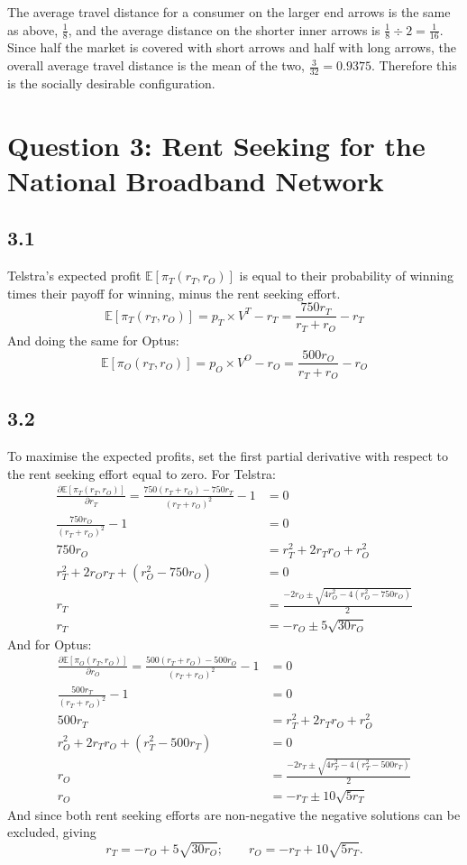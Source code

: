 \documentclass{article}
\newcommand{\tE}[1]{$\mathbb{E}[\mbox{#1}]$}
\newcommand{\E}[1]{\mathbb{E}[\mbox{#1}]}
\begin{document}
\noindent The average travel distance for a consumer on the larger end arrows is the same as above, $\frac{1}{8}$, and the average distance on the shorter inner arrows is $\frac{1}{8} \div 2 = \frac{1}{16}$. Since half the market is covered with short arrows and half with long arrows, the overall average travel distance is the mean of the two, $\frac{3}{32} = 0.9375$. Therefore this is the socially desirable configuration.

\section*{Question 3: Rent Seeking for the National Broadband Network}
\subsection*{3.1}
Telstra's expected profit \tE{$\pi_{T}(r_{T}, r_{O})$} is equal to their probability of winning times their payoff for winning, minus the rent seeking effort.
$$\E{$\pi_{T}(r_{T}, r_{O})$} = p_{T} \times V^{T} - r_{T} = \frac{750r_{T}}{r_{T} + r_{O}} - r_{T}$$
And doing the same for Optus:
$$\E{$\pi_{O}(r_{T}, r_{O})$} = p_{O} \times V^{O} - r_{O} = \frac{500r_{O}}{r_{T} + r_{O}} - r_{O}$$

\subsection*{3.2}
To maximise the expected profits, set the first partial derivative with respect to the rent seeking effort equal to zero. For Telstra:
\begin{align*}
    \frac{\partial \E{$\pi_{T}(r_{T}, r_{O})$}}{\partial r_{T}} = \frac{750(r_{T} + r_{O}) - 750r_{T}}{(r_{T} + r_{O})^{2}} - 1 &= 0\\
    \frac{750r_{O}}{(r_{T} + r_{O})^{2}} - 1 &= 0\\
    750r_{O} &= r_{T}^{2} + 2r_{T}r_{O} + r_{O}^{2}\\
    r_{T}^{2} + 2r_{O}r_{T} + (r_{O}^{2} - 750r_{O}) &= 0\\
    r_{T} &= \frac{-2r_{O} \pm \sqrt{4r_{O}^{2} - 4(r_{O}^{2} - 750r_{O})}}{2}\\
    r_{T} &= -r_{O} \pm 5\sqrt{30r_{O}}
\end{align*}
And for Optus:
\begin{align*}
    \frac{\partial \E{$\pi_{O}(r_{T}, r_{O})$}}{\partial r_{O}} = \frac{500(r_{T} + r_{O}) - 500r_{O}}{(r_{T} + r_{O})^{2}} - 1 &= 0\\
    \frac{500r_{T}}{(r_{T} + r_{O})^{2}} - 1 &= 0\\
    500r_{T} &= r_{T}^{2} + 2r_{T}r_{O} + r_{O}^{2}\\
    r_{O}^{2} + 2r_{T}r_{O} + (r_{T}^{2} - 500r_{T}) &= 0\\
    r_{O} &= \frac{-2r_{T} \pm \sqrt{4r_{T}^{2} - 4(r_{T}^{2} - 500r_{T})}}{2}\\
    r_{O} &= -r_{T} \pm 10\sqrt{5r_{T}}
\end{align*}
And since both rent seeking efforts are non-negative the negative solutions can be excluded, giving
$$r_{T} = -r_{O} + 5\sqrt{30r_{O}}; \qquad r_{O} = -r_{T} + 10\sqrt{5r_{T}}.$$
\end{document}
